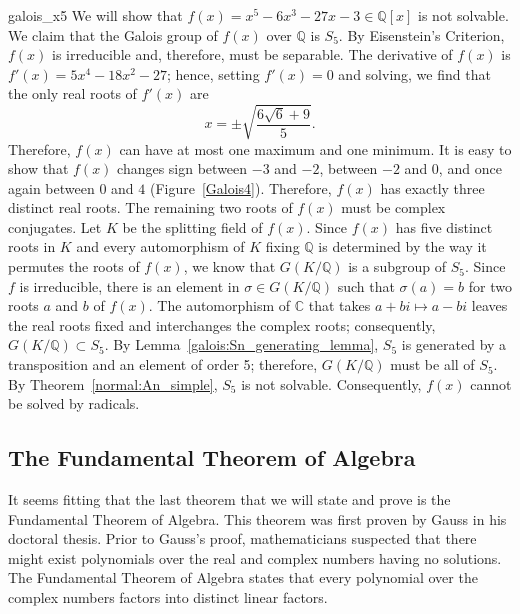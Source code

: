  

\begin{example}{galois_x5}
We will show that $f(x) = x^5 - 6 x^3 - 27 x - 3 \in {\mathbb Q}[x]$ is
not solvable. We claim that the Galois group of $f(x)$ over ${\mathbb Q}$
is $S_5$. By Eisenstein's Criterion, $f(x)$ is irreducible and,
therefore, must be separable. The derivative of $f(x)$ is $f'(x) = 5
x^4 - 18 x^2 - 27$; hence, setting $f'(x) = 0$ and solving, we find
that the only real roots of $f'(x)$ are
\[
x = \pm \sqrt{ \frac{6 \sqrt{6} + 9 }{5} }.
\]
Therefore, $f(x)$ can have at most one maximum and one minimum.  It is
easy to show that $f(x)$ changes sign between $-3$ and $-2$, between
$-2$ and $0$, and once again between $0$ and $4$
(Figure~\ref{Galois4}). Therefore, $f(x)$ has exactly three distinct
real roots. The remaining two roots of $f(x)$ must be complex
conjugates. Let $K$ be the splitting field of $f(x)$. Since $f(x)$ has
five distinct roots in $K$ and every automorphism of $K$ fixing ${\mathbb
Q}$ is determined by the way it permutes the roots of $f(x)$, we know
that $G(K/{\mathbb Q})$ is a subgroup of $S_5$. Since $f$ is irreducible,
there is an element in $\sigma \in G(K/{\mathbb Q})$ such that $\sigma(a)
= b$ for two roots $a$ and $b$ of $f(x)$. The automorphism of ${\mathbb
C}$ that takes $a+bi \mapsto a-bi$ leaves the real roots fixed and
interchanges the complex roots; consequently, $G(K/{\mathbb Q} ) \subset
S_5$. By Lemma~\ref{galois:Sn_generating_lemma}, $S_5$ is generated by a transposition and an
element of order 5; therefore, $G(K/{\mathbb Q} )$ must be all of $S_5$. By
Theorem~\ref{normal:An_simple}, $S_5$ is not solvable. Consequently, $f(x)$ cannot be
solved by radicals.  
\end{example}
 
 
 
\subsection*{The Fundamental Theorem of Algebra}
 
 
It seems fitting that the last theorem that we will state and prove
is the Fundamental Theorem of Algebra. This theorem was first proven
by Gauss in his doctoral thesis.  Prior to Gauss's proof, mathematicians 
suspected that there might exist polynomials over the real and complex 
numbers having no solutions. The Fundamental Theorem of Algebra states
that every polynomial over the complex numbers factors into distinct
linear factors. 
 
